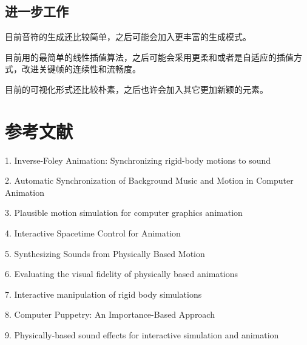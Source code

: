 \documentclass[a4paper, 12pt]{article}
\begin{document}
\subsection{进一步工作}

目前音符的生成还比较简单，之后可能会加入更丰富的生成模式。

目前用的最简单的线性插值算法，之后可能会采用更柔和或者是自适应的插值方式，改进关键帧的连续性和流畅度。

目前的可视化形式还比较朴素，之后也许会加入其它更加新颖的元素。

\section{参考文献}

1. Inverse-Foley Animation: Synchronizing rigid-body motions to sound

2. Automatic Synchronization of Background Music and Motion in Computer Animation

3. Plausible motion simulation for computer graphics animation

4. Interactive Spacetime Control for Animation

5. Synthesizing Sounds from Physically Based Motion

6. Evaluating the visual fidelity of physically based animations

7. Interactive manipulation of rigid body simulations

8. Computer Puppetry: An Importance-Based Approach

9. Physically-based sound effects for interactive simulation and animation
\end{document}
